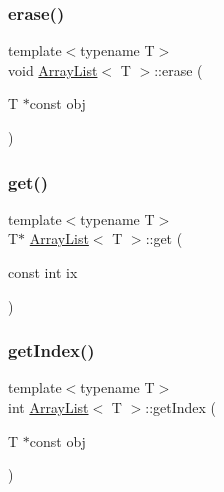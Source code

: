 \mbox{\label{classArrayList_a3bde0dcf3bfc85468bdb85f8773e6630}} 
\subsubsection{\texorpdfstring{erase()}{erase()}\hspace{0.1cm}{\footnotesize\ttfamily [2/2]}}
{\footnotesize\ttfamily template$<$typename T$>$ \\
void \hyperlink{classArrayList}{Array\+List}$<$ T $>$\+::erase (\begin{DoxyParamCaption}\item[{T $\ast$const}]{obj }\end{DoxyParamCaption})\hspace{0.3cm}{\ttfamily [inline]}}

\mbox{\label{classArrayList_a5a6bcfd414e7a7cfd4760a21e1eaf8c0}} 
\subsubsection{\texorpdfstring{get()}{get()}}
{\footnotesize\ttfamily template$<$typename T$>$ \\
T$\ast$ \hyperlink{classArrayList}{Array\+List}$<$ T $>$\+::get (\begin{DoxyParamCaption}\item[{const int}]{ix }\end{DoxyParamCaption})\hspace{0.3cm}{\ttfamily [inline]}}

\mbox{\label{classArrayList_a0059f89292056026e8a4b900828d364e}} 
\subsubsection{\texorpdfstring{get\+Index()}{getIndex()}}
{\footnotesize\ttfamily template$<$typename T$>$ \\
int \hyperlink{classArrayList}{Array\+List}$<$ T $>$\+::get\+Index (\begin{DoxyParamCaption}\item[{T $\ast$const}]{obj }\end{DoxyParamCaption})\hspace{0.3cm}{\ttfamily [inline]}}

